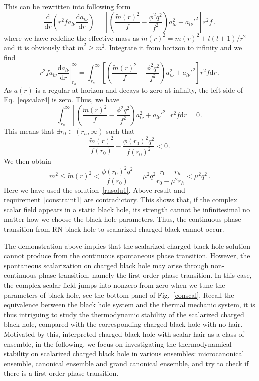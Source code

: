 \documentclass[pr, twocolumn, preprintnumbers, showpacs,footnoteadded, superscriptaddress,nofootinbib,longbibliography]{revtex4-1}
\newcommand{\td}{\mathrm{d}}
\begin{document}
%
This can be rewritten into following form
%
\begin{equation}\label{eqscalar3}
  \frac{\td}{\td r}\left(r^2f a_{l \nu}\frac{\td a_{l \nu}}{\td r}\right)=\left[\left(\frac{\tilde{m}(r)^2}{f}-\frac{\phi^2q^2}{f^2}\right)a_{l \nu}^2+a_{l \nu}'^2\right]r^2f \, .
\end{equation}
%
where we have redefine the effective mass as $\tilde{m}(r)^2 = m(r)^2 + l(l+1)/r^2$ and it is obviously that $\tilde{m}^2 \geq m^2$.
Integrate it from horizon to infinity and we find
%
\begin{equation}\label{eqscalar4}
  \left.r^2f a_{l \nu}\frac{\td a_{l \nu}}{\td r}\right|_{r_h}^\infty=\int_{r_h}^{\infty}\left[\left(\frac{\tilde{m}(r)^2}{f}-\frac{\phi^2q^2}{f^2}\right)a_{l \nu}^2+a_{l \nu}'^2\right]r^2f\td r \, .
\end{equation}
%
As $a(r)$ is a regular at horizon and decays to zero at infinity, the left side of Eq.~\eqref{eqscalar4} is zero. Thus, we have
%
\begin{equation}
\int_{r_h}^{\infty}\left[\left(\frac{\tilde{m}(r)^2}{f}-\frac{\phi^2q^2}{f^2}\right)a_{l \nu}^2+a_{l \nu}'^2\right]r^2f\td r=0\,.
\end{equation}
%
This means that $\exists r_0\in(r_h,\infty)$ such that
%
\begin{equation}\label{condh1}
  \frac{\tilde{m}(r)^2}{f(r_0)}-\frac{\phi(r_0)^2 q^2}{f(r_0)^2}<0\,.
\end{equation}
%
We then obtain
%
\begin{equation}\label{condh2}
m^2\leq \tilde{m}(r)^2<\frac{\phi(r_0)^2 q^2}{f(r_0)}=\mu^2q^2\frac{r_0-r_h}{r_0-\mu^2r_h}<\mu^2q^2\,.
\end{equation}
%
Here we have used the solution~\eqref{rnsolu1}. Above result and requirement~\eqref{constraint1} are contradictory. This shows that, if the complex scalar field appears in a static black hole, its strength cannot be infinitesimal no matter how we choose the black hole parameters.  Thus, the continuous phase transition from RN black hole to scalarized charged black cannot occur.

The demonstration above implies that the scalarized charged black hole solution cannot produce from the continuous spontaneous phase transition. However, the spontaneous scalarization on charged black hole may arise through non-continuous phase transition, namely the first-order phase transition. In this case, the complex scalar field jumps into nonzero from zero when we tune the parameters of black hole, see the bottom panel of Fig.~\ref{conscal}. Recall the equivalence between the black hole system and the thermal mechanic system, it is thus intriguing to study the thermodynamic stability of the scalarized charged black hole, compared with the corresponding charged black hole with no hair. Motivated by this, interpreted charged black hole with scalar hair as a class of ensemble, in the following, we focus on investigating the thermodynamical stability on scalarized charged black hole in various ensembles: microcanonical ensemble, canonical ensemble and grand canonical ensemble, and try to check if there is a first order phase transition.
\end{document}
